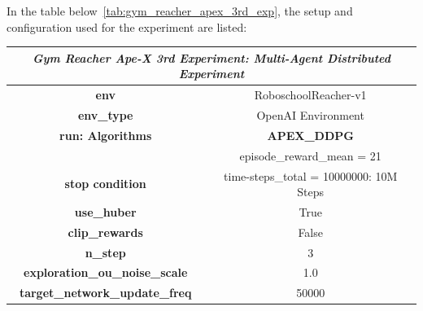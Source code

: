 In the table below~\ref{tab:gym_reacher_apex_3rd_exp}, the setup and configuration used for the experiment are listed:
\begin{table}[!htb]
	\centering
	\begin{tabular}{|c|l|l|c|l|l|}
		\hline
		\multicolumn{6}{|c|}{\textit{\textbf{Gym Reacher Ape-X 3rd Experiment: Multi-Agent Distributed Experiment}}}                                                        \\ \hline
		\multicolumn{3}{|c|}{\textbf{env}}                                            & \multicolumn{3}{c|}{RoboschoolReacher-v1}                                            \\ \hline
		\multicolumn{3}{|c|}{\textbf{env\_type}}                                      & \multicolumn{3}{c|}{OpenAI Environment}                                              \\ \hline
		\multicolumn{3}{|c|}{\textbf{run: Algorithms}}                                & \multicolumn{3}{c|}{\cellcolor[HTML]{C0C0C0}\textbf{APEX\_DDPG}}                     \\ \hline
		\multicolumn{3}{|c|}{}                                                        & \multicolumn{3}{c|}{\cellcolor[HTML]{E1F7E1}episode\_reward\_mean = 21}              \\ \cline{4-6} 
		\multicolumn{3}{|c|}{\multirow{-2}{*}{\textbf{stop condition}}}               & \multicolumn{3}{c|}{\cellcolor[HTML]{E1F7E1}time-steps\_total = 10000000: 10M Steps} \\ \hline
		\multicolumn{3}{|c|}{\textbf{use\_huber}}                                     & \multicolumn{3}{c|}{True}                                                            \\ \hline
		\multicolumn{3}{|c|}{\textbf{clip\_rewards}}                                  & \multicolumn{3}{c|}{False}                                                           \\ \hline
		\multicolumn{3}{|c|}{\textbf{n\_step}}                                        & \multicolumn{3}{c|}{3}                                                               \\ \hline
		\multicolumn{3}{|c|}{\textbf{exploration\_ou\_noise\_scale}}                  & \multicolumn{3}{c|}{1.0}                                                             \\ \hline
		\multicolumn{3}{|c|}{\textbf{target\_network\_update\_freq}}                  & \multicolumn{3}{c|}{50000}                                                           \\ \hline

\end{tabular}
\end{table}
